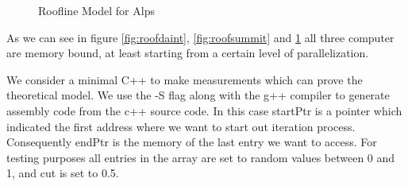 \documentclass[]{article}
\begin{document}
\begin{figure}[H]
	\begin{center}
	\end{center}
	\caption{Roofline Model for Alps}
	\label{fig:roofalps}
\end{figure}

As we can see in figure \ref{fig:roofdaint}, \ref{fig:roofsummit} and \ref{fig:roofalps} all three computer are memory bound, at least starting from a certain level of parallelization.

We consider a minimal C++ to make measurements which can prove the theoretical model. We use the -S flag along with the g++ compiler to generate assembly code from the c++ source code. In this case startPtr is a pointer which indicated the first address where we want to start out iteration process. Consequently endPtr is the memory of the last entry we want to access. For testing purposes all entries in the array are set to random values between 0 and 1, and cut is set to 0.5. 
\end{document}
